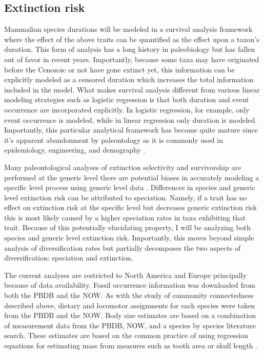 \documentclass[11pt,letterpaper]{article}
\begin{document}
\subsection{Extinction risk}
Mammalian species durations will be modeled in a survival analysis framework where the effect of the above traits can be quantified as the effect upon a taxon's duration. This form of analysis has a long history in paleobiology \citep{Simpson1944,Simpson1953,VanValen1973,VanValen1979,Baumiller1993,Foote1988} but has fallen out of favor in recent years. Importantly, because some taxa may have originated before the Cenozoic or not have gone extinct yet, this information can be explicitly modeled as a censored duration which increases the total information included in the model. What makes survival analysis different from various linear modeling strategies such as logistic regression is that both duration and event occurrence are incorporated explicitly. In logistic regression, for example, only event occurrence is modeled, while in linear regression only duration is modeled. Importantly, this particular analytical framework has become quite mature since it's apparent abandonment by paleontology as it is commonly used in epidemiology, engineering, and demography \citep{Kleinbaum2005}. 

Many paleontological analyses of extinction selectivity and survivorship are performed at the generic level \citep{Tomiya2013,Liow2008,Harnik2013,Finnegan2008,Foote2006} there are potential biases in accurately modeling a specific level process using generic level data \citep{Raup1975,Sepkoski1975,Simpson2006,Raup1991a,VanValen1979}. Differences in species and generic level extinction risk can be attributed to speciation. Namely, if a trait has no effect on extinction risk at the specific level but decreases generic extinction risk this is most likely caused by a higher speciation rates in taxa exhibiting that trait. Because of this potentially elucidating property, I will be analyzing both species and generic level extinction risk. Importantly, this moves beyond simple analysis of diversification rates but partially decomposes the two aspects of diversification: speciation and extinction.

The current analyses are restricted to North America and Europe principally because of data availability. Fossil occurrence information was downloaded from both the PBDB and the NOW. As with the study of community connectedness described above, dietary and locomotor assignments for each species were taken from the PBDB and the NOW. Body size estimates are based on a combination of measurement data from the PBDB, NOW, and a species by species literature search. These estimates are based on the common practice of using regression equations for estimating mass from measures such as tooth area or skull length \citep{Alroy1998,Tomiya2013,Jernvall2004,Alroy2009,Slater2013a}.
\end{document}
